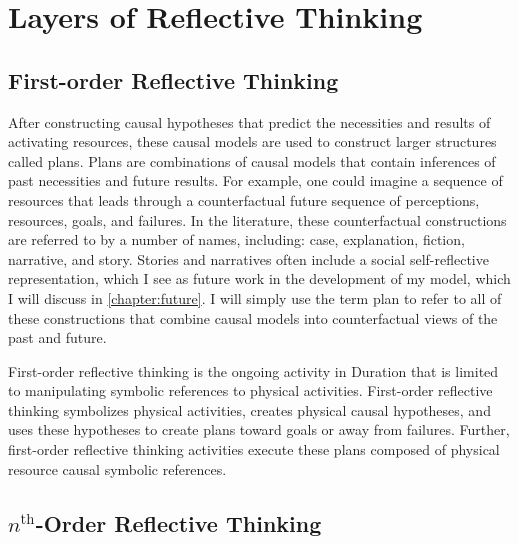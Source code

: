 \chapter{Layers of Reflective Thinking}
\label{chapter:layers_of_reflective_thinking}

\section{First-order Reflective Thinking}

After constructing causal hypotheses that predict the necessities and
results of activating resources, these causal models are used to
construct larger structures called plans.  Plans are combinations of
causal models that contain inferences of past necessities and future
results.  For example, one could imagine a sequence of resources that
leads through a counterfactual future sequence of perceptions,
resources, goals, and failures.  In the literature, these
counterfactual constructions are referred to by a number of names,
including: case, explanation, fiction, narrative, and story.  Stories
and narratives often include a social self-reflective representation,
which I see as future work in the development of my model, which I
will discuss in \autoref{chapter:future}.  I will simply use the term
plan to refer to all of these constructions that combine causal models
into counterfactual views of the past and future.

First-order reflective thinking is the ongoing activity in Duration
that is limited to manipulating symbolic references to physical
activities.  First-order reflective thinking symbolizes physical
activities, creates physical causal hypotheses, and uses these
hypotheses to create plans toward goals or away from failures.
Further, first-order reflective thinking activities execute these
plans composed of physical resource causal symbolic references.

\section{$n^\text{th}$-Order Reflective Thinking}

